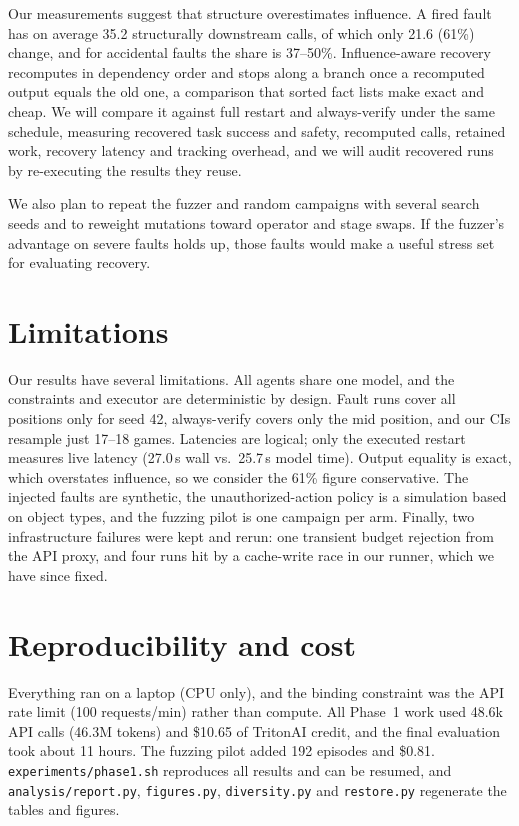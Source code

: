 \documentclass[10pt]{article}
\newcommand{\code}[1]{\texttt{\small #1}}
\begin{document}
Our measurements suggest that structure overestimates influence. A fired fault has on average 35.2
structurally downstream calls, of which only 21.6 (61\%) change, and for accidental faults the
share is 37--50\%. Influence-aware recovery recomputes in dependency order and stops along a branch
once a recomputed output equals the old one, a comparison that sorted fact lists make exact and
cheap. We will compare it against full restart and always-verify under the same schedule, measuring
recovered task success and safety, recomputed calls, retained work, recovery latency and tracking
overhead, and we will audit recovered runs by re-executing the results they reuse.

We also plan to repeat the fuzzer and random campaigns with several search seeds and to reweight
mutations toward operator and stage swaps. If the fuzzer's advantage on severe faults holds up, those
faults would make a useful stress set for evaluating recovery.

\section{Limitations}
Our results have several limitations. All agents share one model, and the constraints and executor
are deterministic by design. Fault runs cover all positions only for seed 42, always-verify covers
only the mid position, and our CIs resample just 17--18 games. Latencies are logical; only the
executed restart measures live latency (27.0\,s wall vs.\ 25.7\,s model time). Output equality is
exact, which overstates influence, so we consider the 61\% figure conservative. The injected faults
are synthetic, the unauthorized-action policy is a simulation based on object types, and the fuzzing
pilot is one campaign per arm. Finally, two infrastructure failures were kept and rerun: one
transient budget rejection from the API proxy, and four runs hit by a cache-write race in our runner,
which we have since fixed.

\section{Reproducibility and cost}
Everything ran on a laptop (CPU only), and the binding constraint was the API rate limit (100
requests/min) rather than compute. All Phase~1 work used 48.6k API calls (46.3M tokens) and \$10.65
of TritonAI credit, and the final evaluation took about 11 hours. The fuzzing pilot added 192
episodes and \$0.81. \code{experiments/phase1.sh} reproduces all results and can be resumed, and
\code{analysis/report.py}, \code{figures.py}, \code{diversity.py} and \code{restore.py} regenerate
the tables and figures.
\end{document}
